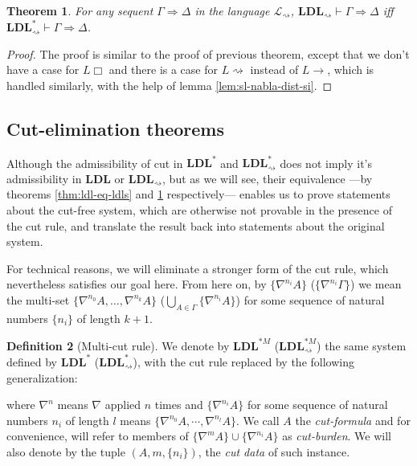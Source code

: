 \documentclass[12pt,a4paper]{article}
\theoremstyle{plain}
\newtheorem{thm}{Theorem}[section]
\theoremstyle{definition}
\newtheorem{dfn}[thm]{Definition}
\begin{document}
\begin{thm}\label{thm:sldl-eq-sldls}
	For any sequent $\Gamma \Rightarrow \Delta$ in the language $\mathcal{L}_{\rightsquigarrow}$, $\mathbf{LDL}_{\rightsquigarrow} \vdash \Gamma \Rightarrow \Delta$ iff $\mathbf{LDL}^*_{\rightsquigarrow} \vdash \Gamma \Rightarrow \Delta$.
\end{thm}
\begin{proof}
	The proof is similar to the proof of previous theorem, except that we don't have a case for $L\Box$ and there is a case for $L\rightsquigarrow$ instead of $L\rightarrow$, which is handled similarly, with the help of lemma \ref{lem:sl-nabla-dist-si}.
\end{proof}

\subsection{Cut-elimination theorems}
Although the admissibility of cut in $\mathbf{LDL}^*$ and $\mathbf{LDL}^*_{\rightsquigarrow}$ does not imply it's admissibility in $\mathbf{LDL}$ or $\mathbf{LDL}_{\rightsquigarrow}$, but as we will see, their equivalence ---by theorems \ref{thm:ldl-eq-ldls} and \ref{thm:sldl-eq-sldls} respectively--- enables us to prove statements about the cut-free system, which are otherwise not provable in the presence of the cut rule, and translate the result back into statements about the original system.

For technical reasons, we will eliminate a stronger form of the cut rule, which nevertheless satisfies our goal here. From here on, by $\{\nabla^{n_i} A\}$ ($\{\nabla^{n_i} \Gamma\}$) we mean the multi-set $\{ \nabla^{n_0} A, \dots, \nabla^{n_k} A \}$ ($\bigcup_{A \in \Gamma} \{\nabla^{n_i} A\}$) for some sequence of natural numbers $\{n_i\}$ of length $k+1$.

\begin{dfn}[Multi-cut rule] We denote by $\mathbf{LDL}^{*M}$ ($\mathbf{LDL}^{*M}_{\rightsquigarrow}$) the same system defined by $\mathbf{LDL}^*$ ($\mathbf{LDL}^*_{\rightsquigarrow}$), with the cut rule replaced by the following generalization:
\begin{prooftree}
\end{prooftree}
where $\nabla^n$ means $\nabla$ applied $n$ times and $\{\nabla^{n_i} A\}$ for some sequence of natural numbers $n_i$ of length $l$ means $\{\nabla^{n_0} A,\dotsb, \nabla^{n_l} A\}$.
We call $A$ the \emph{cut-formula} and for convenience, will refer to members of $\{\nabla^m A\} \cup \{\nabla^{n_i} A\}$ as \emph{cut-burden}. We will also denote by the tuple $(A, m, \{n_i\})$, the \emph{cut data} of such instance.
\end{dfn}
\end{document}
